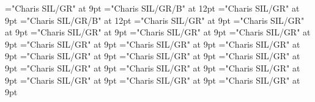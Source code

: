 \documentclass[gps1,twoside]{article}
\begin{document}
\font\configtargetconfigtargetconfigtargetslexsensereferencelexsensereferencessensesensessubentrysubentriesentrybefore="Charis SIL/GR" at 9pt
\font\spanbzhheadwordconfigtargetconfigtargetslexsensereferencelexsensereferencessensesensessubentrysubentriesentry="Charis SIL/GR/B" at 12pt
\font\spanspanheadwordconfigtargetconfigtargetslexsensereferencelexsensereferencessensesensessubentrysubentriesentrybefore="Charis SIL/GR" at 9pt
\font\spanheadwordconfigtargetconfigtargetslexsensereferencelexsensereferencessensesensessubentrysubentriesentry="Charis SIL/GR/B" at 12pt
\font\variantformentrybackrefvariantformentrybackrefvariantformentrybackrefssensesensessubentrysubentriesentrybefore="Charis SIL/GR" at 9pt
\font\variantformentrybackrefssensesensessubentrysubentriesentrybefore="Charis SIL/GR" at 9pt
\font\variantformentrybackrefssensesensessubentrysubentriesentryafter="Charis SIL/GR" at 9pt
\font\variantentrytypevariantentrytypevariantentrytypesvariantformentrybackrefvariantformentrybackrefssensesensessubentrysubentriesentrybefore="Charis SIL/GR" at 9pt
\font\variantentrytypesvariantformentrybackrefvariantformentrybackrefssensesensessubentrysubentriesentryafter="Charis SIL/GR" at 9pt
\font\spanspanreverseabbrvariantentrytypevariantentrytypesvariantformentrybackrefvariantformentrybackrefssensesensessubentrysubentriesentrybefore="Charis SIL/GR" at 9pt
\font\spanreverseabbrvariantentrytypevariantentrytypesvariantformentrybackrefvariantformentrybackrefssensesensessubentrysubentriesentrylastchildafter="Charis SIL/GR" at 9pt
\font\spanspanheadwordvariantformentrybackrefvariantformentrybackrefssensesensessubentrysubentriesentrybefore="Charis SIL/GR" at 9pt
\font\spanspanowningentrysummarydefinitionvariantformentrybackrefvariantformentrybackrefssensesensessubentrysubentriesentrybefore="Charis SIL/GR" at 9pt
\font\spanowningentrysummarydefinitionvariantformentrybackrefvariantformentrybackrefssensesensessubentrysubentriesentrylastchildafter="Charis SIL/GR" at 9pt
\font\scientificnamesensesensessubentrysubentriesentryafter="Charis SIL/GR" at 9pt
\font\semanticdomainsemanticdomainsemanticdomainssensesensessubentrysubentriesentrybefore="Charis SIL/GR" at 9pt
\font\semanticdomainssensesensessubentrysubentriesentrybefore="Charis SIL/GR" at 9pt
\font\semanticdomainssensesensessubentrysubentriesentryafter="Charis SIL/GR" at 9pt
\font\spanspanabbreviationsemanticdomainsemanticdomainssensesensessubentrysubentriesentrybefore="Charis SIL/GR" at 9pt
\font\spanabbreviationsemanticdomainsemanticdomainssensesensessubentrysubentriesentrylastchildafter="Charis SIL/GR" at 9pt
\font\spanspannamesemanticdomainsemanticdomainssensesensessubentrysubentriesentrybefore="Charis SIL/GR" at 9pt
\end{document}
